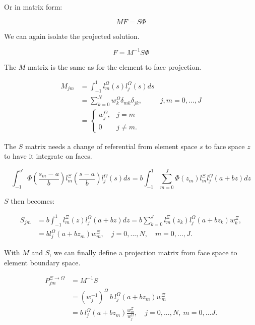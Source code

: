 Or in matrix form:

\begin{equation} 
	MF = S \Phi
\end{equation}

We can again isolate the projected solution.

\begin{equation} 
	F = M^{-1} S \Phi
\end{equation}

The $M$ matrix is the same as for the element to face projection.

\begin{equation} \label{equ:matrix_M_face_to_element}
	\begin{aligned}
		M_{jm} &= \int_{-1}^{1}l_m^{\Omega}(s)l_j^{\Omega}(s)ds \\
		&= \sum_{k = 0}^{N} w_k ^{\Omega} \delta_{mk}\delta_{jk}, & j, m = 0, ..., J \\
		&= \left\{\begin{matrix}
			w_j^{\Omega }, & j = m \\ 
			0 & j \neq m.
			\end{matrix}\right.
	\end{aligned}
\end{equation}

The $S$ matrix needs a change of referential from element space $s$ to face space $z$ to have it
integrate on faces.

\begin{equation}
	\int_{-1}^{o'} \Phi(\frac{s_m -a}{b})l_m^\Xi(\frac{s -a}{b}) l_j^\Omega(s)ds
	= b\int_{-1}^{1}\sum_{m = 0}^{J} \Phi(z_m)l_m^{\Xi}l_j^{\Omega}(a + bz)dz
\end{equation}

$S$ then becomes: 

\begin{equation}
	\begin{aligned}
		S_{jm} &=  b\int_{-1}^{1}l_m^{\Xi}(z)l_j^{\Omega}(a + bz)dz
		= b\sum_{k = 0}^{J}l_m^{\Xi}(z_k)l_j^{\Omega}(a +b z_k)w_k^{\Xi}, \\
		&= b l_j^{\Omega}(a + bz_m)w_m^{\Xi}, \quad j = 0, ..., N, \quad m = 0, ..., J.
	\end{aligned}
\end{equation}

With $M$ and $S$, we can finally define a projection matrix from face space to element boundary space.

\begin{equation}
	\begin{aligned}
		P^{\Xi \rightarrow \Omega}_{jm} &= M^{-1}S \\
		&= (w_j^{-1})^{\Omega } \: b \: l_j^{\Omega }(a + bz_m)w_m^{\Xi}\\
		&= b \: l_j^{\Omega}(a + bz_m)\frac{w_m^{\Xi}}{w_j^{\Omega}}, \quad j = 0, ..., N, \: m = 0, ... J. 
	\end{aligned}
\end{equation} 

